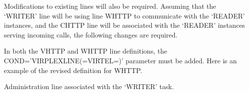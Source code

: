 \documentclass[letterpaper,10pt,english]{sphinxmanual}
\begin{document}
\begin{sphinxVerbatim}[commandchars=\\\{\}]
                                            
                               
                                                         
                                                     
                                                        
                                                       
\end{sphinxVerbatim}

\sphinxAtStartPar
Modifications to existing lines will also be required. Assuming that the ‘WRITER’ line will be using line W\sphinxhyphen{}HTTP to communicate with the ‘READER’ instances, and the C\sphinxhyphen{}HTTP line will be associated with the ‘READER’ instances serving incoming calls, the following changes are required.

\sphinxAtStartPar
{}

\sphinxAtStartPar
In both the V\sphinxhyphen{}HTTP and W\sphinxhyphen{}HTTP line definitions, the COND=’VIRPLEX\sphinxhyphen{}LINE(=VIRTEL=)’ parameter must be added. Here is an example of the revised definition for W\sphinxhyphen{}HTTP.

\sphinxAtStartPar
Administration line associated with the ‘WRITER’ task.
\end{document}
